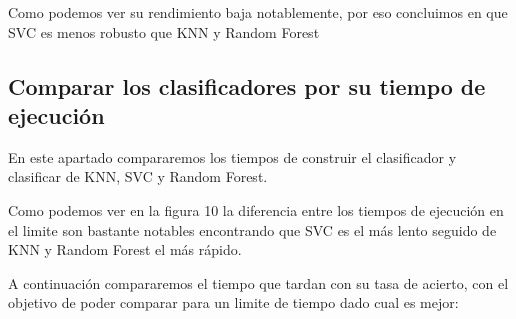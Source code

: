 \documentclass[8pt,a4paper]{article}
\begin{document}
Como podemos ver su rendimiento baja notablemente, por eso concluimos en que SVC es menos robusto que KNN y Random Forest

\subsection{Comparar los clasificadores por su tiempo de ejecución}

En este apartado compararemos los tiempos de construir el clasificador y clasificar de KNN, SVC y Random Forest.



Como podemos ver en la figura 10 la diferencia entre los tiempos de ejecución en el limite son bastante notables encontrando que SVC es el más lento seguido de KNN y Random Forest el más rápido.

A continuación compararemos el tiempo que tardan con su tasa de acierto, con el objetivo de poder comparar para un limite de tiempo dado cual es mejor:
\end{document}
